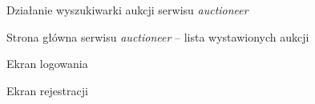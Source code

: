 \begin{figure}[h]
\centering
{}
\caption{Działanie wyszukiwarki aukcji serwisu \textit{auctioneer}}
\label{screen02}
\end{figure}

\begin{figure}[h]
\centering
{}
\caption{Strona główna serwisu \textit{auctioneer} -- lista wystawionych aukcji}
\label{screen01}
\end{figure}

\begin{figure}[h]
\centering
{}
\caption{Ekran logowania}
\label{screen03}
\end{figure}

\begin{figure}[h]
\centering
{}
\caption{Ekran rejestracji}
\label{screen13}
\end{figure}


